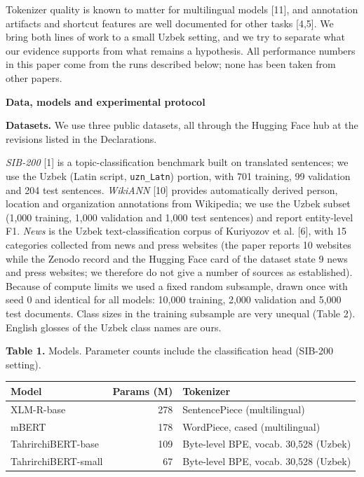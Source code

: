 \documentclass[11pt]{book}
\begin{document}
Tokenizer quality is known to matter for multilingual models [11], and annotation artifacts and shortcut features are well documented for other tasks [4,5]. We bring both lines of work to a small Uzbek setting, and we try to separate what our evidence supports from what remains a hypothesis. All performance numbers in this paper come from the runs described below; none has been taken from other papers.

\begin{center}
\textbf{Data, models and experimental protocol}
\end{center}

\textbf{Datasets.} We use three public datasets, all through the Hugging Face hub at the revisions listed in the Declarations.

\emph{SIB-200} [1] is a topic-classification benchmark built on translated sentences; we use the Uzbek (Latin script, \texttt{uzn\_Latn}) portion, with 701 training, 99 validation and 204 test sentences. \emph{WikiANN} [10] provides automatically derived person, location and organization annotations from Wikipedia; we use the Uzbek subset (1,000 training, 1,000 validation and 1,000 test sentences) and report entity-level F1. \emph{News} is the Uzbek text-classification corpus of Kuriyozov et al. [6], with 15 categories collected from news and press websites (the paper reports 10 websites while the Zenodo record and the Hugging Face card of the dataset state 9 news and press websites; we therefore do not give a number of sources as established). Because of compute limits we used a fixed random subsample, drawn once with seed 0 and identical for all models: 10,000 training, 2,000 validation and 5,000 test documents. Class sizes in the training subsample are very unequal (Table 2). English glosses of the Uzbek class names are ours.

\begin{center}
\textbf{Table 1.} Models. Parameter counts include the classification head (SIB-200 setting).\\[2pt]
\begin{tabular}{lrl}
\hline
Model & Params (M) & Tokenizer \\
\hline
XLM-R-base & 278 & SentencePiece (multilingual) \\
mBERT & 178 & WordPiece, cased (multilingual) \\
TahrirchiBERT-base & 109 & Byte-level BPE, vocab. 30,528 (Uzbek) \\
TahrirchiBERT-small & 67 & Byte-level BPE, vocab. 30,528 (Uzbek) \\
\hline
\end{tabular}
\end{center}
\end{document}
